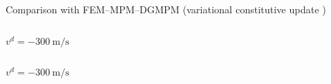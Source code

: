 
%       


\begin{frame}
  \footnotesize Comparison with FEM--MPM--DGMPM (variational constitutive update \cite{LaurentVariational})
  \begin{overprint}
    \begin{columns}
      \begin{column}{0.49\textwidth}
        \vspace{0.18cm}
        \centering
          
          \footnotesize $v^d = -300 \: \text{m/s}$
        \end{column}
      \begin{column}{0.49\textwidth}
        
      \end{column}
    \end{columns}
    \vspace{0.22cm}
    \begin{columns}
      \begin{column}{0.49\textwidth}
        \centering
        
          \footnotesize $v^d = -300 \: \text{m/s}$
      \end{column}
      \begin{column}{0.49\textwidth}
        \centering
        
      \end{column}
    \end{columns}
  \end{overprint}
\end{frame}

